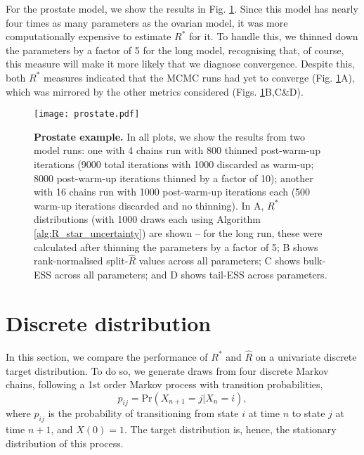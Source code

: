 \documentclass{article}
\begin{document}
For the prostate model, we show the results in Fig. \ref{fig:prostate}. Since this model has nearly four times as many parameters as the ovarian model, it was more computationally expensive to estimate $R^*$ for it. To handle this, we thinned down the parameters by a factor of 5 for the long model, recognising that, of course, this measure will make it more likely that we diagnose convergence. Despite this, both $R^*$ measures indicated that the MCMC runs had yet to converge (Fig. \ref{fig:prostate}A), which was mirrored by the other metrics considered (Figs. \ref{fig:prostate}B,C\&D).

\begin{figure}[!htb]
	\centerline{\texttt{[image: prostate.pdf]}}
	\caption{\textbf{Prostate example.} In all plots, we show the results from two model runs: one with 4 chains run with 800 thinned post-warm-up iterations (9000 total iterations with 1000 discarded as warm-up; 8000 post-warm-up iterations thinned by a factor of 10); another with 16 chains run with 1000 post-warm-up iterations each (500 warm-up iterations discarded and no thinning). In A, $R^*$ distributions (with 1000 draws each using Algorithm \ref{alg:R_star_uncertainty}) are shown -- for the long run, these were calculated after thinning the parameters by a factor of 5; B shows rank-normalised split-$\widehat{R}$ values across all parameters; C shows bulk-ESS across all parameters; and D shows tail-ESS across parameters.}
	\label{fig:prostate}
\end{figure}

\color{red}
\section{Discrete distribution}\label{sec:discrete}
In this section, we compare the performance of $R^*$ and $\widehat{R}$ on a univariate discrete target distribution. To do so, we generate draws from four discrete Markov chains, following a 1st order Markov process with transition probabilities,
%
\begin{equation}
p_{ij} = \text{Pr}(X_{n+1}=j|X_n=i),
\end{equation}
%
where $p_{ij}$ is the probability of transitioning from state $i$ at time $n$ to state $j$ at time $n+1$, and $X(0)=1$. The target distribution is, hence, the stationary distribution of this process.
\end{document}
